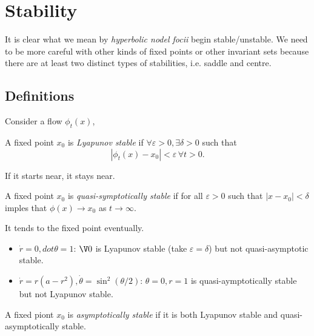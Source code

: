 \documentclass[a4paper]{article}
\begin{document}


\section{Stability}

It is clear what we mean by \emph{hyperbolic nodel focii} begin stable/unstable. We need to be more careful with other kinds of fixed points or other invariant sets because there are at least two distinct types of stabilities, i.e. saddle and centre.

\subsection{Definitions}

Consider a flow \(\phi_t(x)\),
\begin{definition}
 A fixed point \(x_0\) is \emph{Lyapunov stable} if \(\forall\varepsilon>0, \exists\delta>0\) such that
\[
  |\phi_t(x)-x_0| < \varepsilon \, \forall t>0.
\]
\end{definition}

\begin{slogan}
  If it starts near, it stays near.
\end{slogan}

\begin{definition}
  A fixed point \(x_0\) is \emph{quasi-symptotically stable} if for all \(\varepsilon>0\) such that \(|x-x_0|<\delta\) imples that \(\phi(x)\to x_0\) as \(t\to \infty\).
\end{definition}

\begin{slogan}
  It tends to the fixed point eventually.
\end{slogan}

\begin{eg}\leavevmode
  \begin{itemize}
  \item \(\dot r = 0, dot \theta = 1\): \(\V 0\) is Lyapunov stable (take \(\varepsilon = \delta\)) but not quasi-asymptotic stable.
  \item \(\dot r = r(a-r^2), \dot \theta = \sin^2(\theta/2)\): \(\theta=0,r=1\) is quasi-aymptotically stable but not Lyapunov stable.
  \end{itemize}
\end{eg}
    
\begin{definition}
  A fixed piont \(x_0\) is \emph{asymptotically stable} if it is both Lyapunov stable and quasi-asymptotically stable.
\end{definition}
\end{document}

